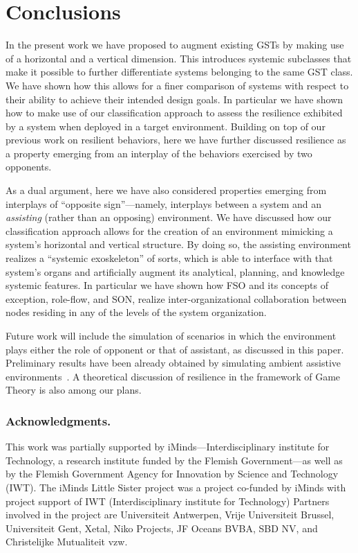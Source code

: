 \documentclass[twocolumn]{svjour3}
\begin{document}
\section{Conclusions}\label{s:end}
In the present work
we have proposed to augment existing GSTs by making use of a horizontal and a vertical dimension.
This introduces systemic subclasses that make it possible to further differentiate
systems belonging to the same GST class. We have shown how this allows for a finer comparison of
systems with respect to their ability to achieve their intended design goals.
In particular we have shown how to make use of our classification approach to
assess the resilience exhibited by a system when deployed in a target environment.
Building on top of our previous work on resilient behaviors, here we have further
discussed resilience as a property emerging from an interplay of the behaviors exercised
by two opponents. 

As a dual argument, here we have also considered properties emerging from
interplays of ``opposite sign''---namely, interplays between a system and an \emph{assisting\/}
(rather than an opposing) environment. We have discussed how our classification approach allows
for the creation of an environment mimicking a system's horizontal and vertical structure.
By doing so, the assisting environment realizes a ``systemic exoskeleton'' of sorts,
which is able to interface with that system's organs and artificially augment its
analytical, planning, and knowledge systemic features. In particular we have shown
how FSO and its concepts of exception, role-flow, and SON, realize inter-organizational
collaboration between nodes residing in any of the levels of the system organization.

Future work will include the simulation of scenarios
in which the environment plays either the role of opponent or that
of assistant, as  
discussed in this paper.
Preliminary results have been already obtained by simulating ambient assistive
environments~\cite{DeFPa15a,DBLP:journals/corr/FlorioP15b}. A theoretical discussion of resilience in the
framework of Game Theory is also among our plans.


\subsubsection*{Acknowledgments.}
This work was partially supported by
iMinds---Interdisci\-pli\-nary institute for Technology, a research institute
funded by the Flemish Government---as well as by the Flemish Government Agency for Innovation by
Science and Technology (IWT).
The iMinds Little Sister project was a project co-funded by iMinds with project support of IWT
(Interdisciplinary institute for Technology)
Partners
involved in the project are
Universiteit Antwerpen,
Vrije Universiteit Brussel,
Universiteit Gent,
Xetal,
Niko Projects,
JF Oceans BVBA,
SBD NV,
and Christelijke Mutualiteit vzw.
\end{document}
